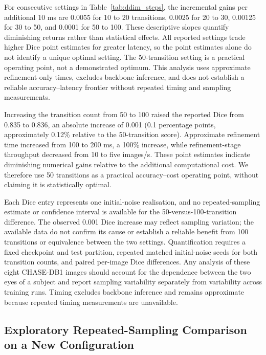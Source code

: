 \documentclass[jimaging,article,submit,pdftex,moreauthors]{Definitions/mdpi}%
\begin{document}
For consecutive settings in Table~\ref{tab:ddim_steps}, the incremental gains per additional 10 ms are 0.0055 for 10 to 20 transitions, 0.0025 for 20 to 30, 0.00125 for 30 to 50, and 0.0001 for 50 to 100. These descriptive slopes quantify diminishing returns rather than statistical effects. All reported settings trade higher Dice point estimates for greater latency, so the point estimates alone do not identify a unique optimal setting. The 50-transition setting is a practical operating point, not a demonstrated optimum. This analysis uses approximate refinement-only times, excludes backbone inference, and does not establish a reliable accuracy--latency frontier without repeated timing and sampling measurements.



Increasing the transition count from 50 to 100 raised the reported Dice from 0.835 to 0.836, an absolute increase of 0.001 (0.1 percentage points, approximately 0.12\% relative to the 50-transition score). Approximate refinement time increased from 100 to 200 ms, a 100\% increase, while refinement-stage throughput decreased from 10 to five images/s. These point estimates indicate diminishing numerical gains relative to the additional computational cost. We therefore use 50 transitions as a practical accuracy--cost operating point, without claiming it is statistically optimal.



Each Dice entry represents one initial-noise realisation, and no repeated-sampling estimate or confidence interval is available for the 50-versus-100-transition difference. The observed 0.001 Dice increase may reflect sampling variation; the available data do not confirm its cause or establish a reliable benefit from 100 transitions or equivalence between the two settings. Quantification requires a fixed checkpoint and test partition, repeated matched initial-noise seeds for both transition counts, and paired per-image Dice differences. Any analysis of these eight CHASE-DB1 images should account for the dependence between the two eyes of a subject and report sampling variability separately from variability across training runs. Timing excludes backbone inference and remains approximate because repeated timing measurements are unavailable.



\subsection{Exploratory Repeated-Sampling Comparison on a New Configuration}
\end{document}
